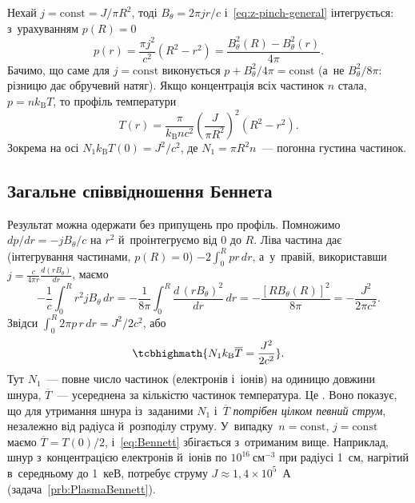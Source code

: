 Нехай $j=\mathrm{const}=J/\pi R^2$, тоді $B_\theta=2\pi jr/c$ і~\eqref{eq:z-pinch-general}
інтегрується: з~урахуванням $p(R)=0$
\begin{equation*}
	p(r)=\frac{\pi j^2}{c^2}\left(R^2-r^2\right)=\frac{B_\theta^2(R)-B_\theta^2(r)}{4\pi}.
\end{equation*}
Бачимо, що саме для $j=\mathrm{const}$ виконується $p+B_\theta^2/4\pi=\mathrm{const}$
(а~не $B_\theta^2/8\pi$: різницю дає обручевий натяг). Якщо концентрація всіх частинок $n$
стала, $p=nk_{\mathrm B}T$, то профіль температури
\begin{equation*}
	T(r)=\frac{\pi}{k_{\mathrm B}nc^2}\left(\frac J{\pi R^2}\right)^2(R^2-r^2).
\end{equation*}
Зокрема на осі $N_1k_{\mathrm B}T(0)=J^2/c^2$, де $N_1=\pi R^2n$~--- погонна густина
частинок.



\subsection{Загальне співвідношення Беннета}



Результат можна одержати без припущень про профіль. Помножимо $dp/dr=-jB_\theta/c$ на
$r^2$ й~проінтегруємо від $0$ до $R$. Ліва частина дає (інтегрування частинами, $p(R)=0$)
$-2\int_0^Rpr\,dr$, а~у~правій, використавши $j=\frac c{4\pi r}\frac{d(rB_\theta)}{dr}$,
маємо
\begin{equation*}
	-\frac1c\int_0^Rr^2jB_\theta\,dr=-\frac1{8\pi}\int_0^R\frac{d\,(rB_\theta)^2}{dr}\,dr=-\frac{[RB_\theta(R)]^2}{8\pi}=-\frac{J^2}{2\pi c^2}.
\end{equation*}
Звідси $\int_0^R2\pi p\,r\,dr=J^2/2c^2$, або
\begin{equation}\label{eq:Bennett}
	\tcbhighmath{N_1k_{\mathrm B}\overline T=\frac{J^2}{2c^2}}.
\end{equation}
Тут $N_1$~--- повне число частинок (електронів і~іонів) на одиницю довжини шнура,
$\overline T$~--- усереднена за кількістю частинок температура. Це . Воно показує, що для утримання шнура із~заданими $N_1$ і~$\overline T$
\emph{потрібен цілком певний струм}, незалежно від радіуса й~розподілу струму.
У~випадку~$n=\mathrm{const}$, $j=\mathrm{const}$ маємо $\overline T=T(0)/2$,
і~\eqref{eq:Bennett} збігається з~отриманим вище. Наприклад, шнур з~концентрацією
електронів й~іонів по $10^{16}~\mathrm{см}^{-3}$ при радіусі 1~см, нагрітий в~середньому
до 1~кеВ, потребує струму $J\approx1{,}4\times10^5$~А (задача~\ref{prb:PlasmaBennett}).



